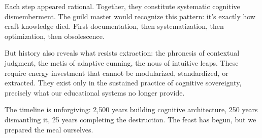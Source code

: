 Each step appeared rational. Together, they constitute systematic cognitive dismemberment. The guild master would recognize this pattern: it's exactly how craft knowledge died. First documentation, then systematization, then optimization, then obsolescence.

But history also reveals what resists extraction: the phronesis of contextual judgment, the metis of adaptive cunning, the nous of intuitive leaps. These require energy investment that cannot be modularized, standardized, or extracted. They exist only in the sustained practice of cognitive sovereignty, precisely what our educational systems no longer provide.

The timeline is unforgiving: 2,500 years building cognitive architecture, 250 years dismantling it, 25 years completing the destruction. The feast has begun, but we prepared the meal ourselves.
